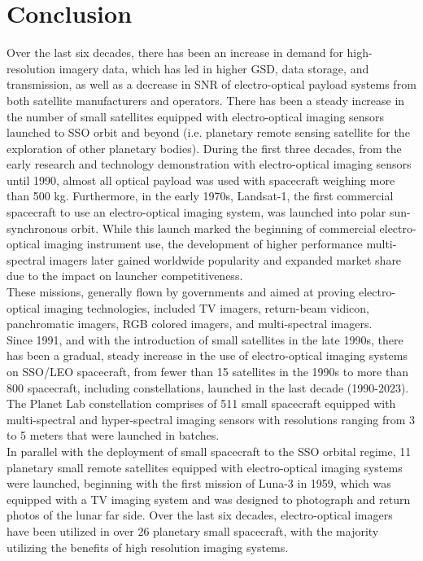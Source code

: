 \documentclass[final,5p,times,twocolumn,authoryear]{elsarticle}
\begin{document}
\section{Conclusion}
Over the last six decades, there has been an increase in demand for high-resolution imagery data, which has led in higher GSD, data storage, and transmission, as well as a decrease in SNR of electro-optical payload systems from both satellite manufacturers and operators.  There has been a steady increase in the number of small satellites equipped with electro-optical imaging sensors launched to SSO orbit and beyond (i.e. planetary remote sensing satellite for the exploration of other planetary bodies). 
During the first three decades, from the early research and technology demonstration with electro-optical imaging sensors until 1990, almost all optical payload was used with spacecraft weighing more than 500 kg. Furthermore, in the early 1970s, Landsat-1, the first commercial spacecraft to use an electro-optical imaging system, was launched into polar sun-synchronous orbit. While this launch marked the beginning of commercial electro-optical imaging instrument use, the development of higher performance multi-spectral imagers later gained worldwide popularity and expanded market share due to the impact on launcher competitiveness.\\
These missions, generally flown by governments and aimed at proving electro-optical imaging technologies, included TV imagers, return-beam vidicon, panchromatic imagers, RGB colored imagers, and multi-spectral imagers.\\
Since 1991, and with the introduction of small satellites in the late 1990s, there has been a gradual, steady increase in the use of electro-optical imaging systems on SSO/LEO spacecraft, from fewer than 15 satellites in the 1990s to more than 800 spacecraft, including constellations, launched in the last decade (1990-2023).  The Planet Lab constellation comprises of 511 small spacecraft equipped with multi-spectral and hyper-spectral imaging sensors with resolutions ranging from 3 to 5 meters that were launched in batches. \\
In parallel with the deployment of small spacecraft to the SSO orbital regime, 11 planetary small remote satellites equipped with electro-optical imaging systems were launched, beginning with the first mission of Luna-3 in 1959, which was equipped with a TV imaging system and was designed to photograph and return photos of the lunar far side. Over the last six decades, electro-optical imagers have been utilized in over 26 planetary small spacecraft, with the majority utilizing the benefits of high resolution imaging systems. \\
\end{document}
